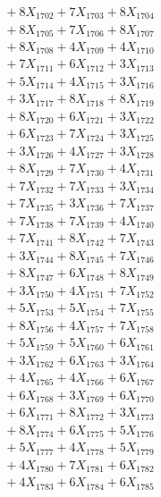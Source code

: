 \documentclass[a4paper,10pt]{article}
\begin{document}
{\begin{align}
&\;  + 8 X_{1702} + 7 X_{1703} + 8 X_{1704} \\[0.3ex]
&\;  + 8 X_{1705} + 7 X_{1706} + 8 X_{1707} \\[0.3ex]
&\;  + 8 X_{1708} + 4 X_{1709} + 4 X_{1710} \\[0.3ex]
&\;  + 7 X_{1711} + 6 X_{1712} + 3 X_{1713} \\[0.3ex]
&\;  + 5 X_{1714} + 4 X_{1715} + 3 X_{1716} \\[0.3ex]
&\;  + 3 X_{1717} + 8 X_{1718} + 8 X_{1719} \\[0.5ex]\allowbreak
&\;  + 8 X_{1720} + 6 X_{1721} + 3 X_{1722} \\[0.3ex]
&\;  + 6 X_{1723} + 7 X_{1724} + 3 X_{1725} \\[0.3ex]
&\;  + 3 X_{1726} + 4 X_{1727} + 3 X_{1728} \\[0.3ex]
&\;  + 8 X_{1729} + 7 X_{1730} + 4 X_{1731} \\[0.3ex]
&\;  + 7 X_{1732} + 7 X_{1733} + 3 X_{1734} \\[0.3ex]
&\;  + 7 X_{1735} + 3 X_{1736} + 7 X_{1737} \\[0.3ex]
&\;  + 7 X_{1738} + 7 X_{1739} + 4 X_{1740} \\[0.3ex]
&\;  + 7 X_{1741} + 8 X_{1742} + 7 X_{1743} \\[0.3ex]
&\;  + 3 X_{1744} + 8 X_{1745} + 7 X_{1746} \\[0.3ex]
&\;  + 8 X_{1747} + 6 X_{1748} + 8 X_{1749} \\[0.5ex]\allowbreak
&\;  + 3 X_{1750} + 4 X_{1751} + 7 X_{1752} \\[0.3ex]
&\;  + 5 X_{1753} + 5 X_{1754} + 7 X_{1755} \\[0.3ex]
&\;  + 8 X_{1756} + 4 X_{1757} + 7 X_{1758} \\[0.3ex]
&\;  + 5 X_{1759} + 5 X_{1760} + 6 X_{1761} \\[0.3ex]
&\;  + 3 X_{1762} + 6 X_{1763} + 3 X_{1764} \\[0.3ex]
&\;  + 4 X_{1765} + 4 X_{1766} + 6 X_{1767} \\[0.3ex]
&\;  + 6 X_{1768} + 3 X_{1769} + 6 X_{1770} \\[0.3ex]
&\;  + 6 X_{1771} + 8 X_{1772} + 3 X_{1773} \\[0.3ex]
&\;  + 8 X_{1774} + 6 X_{1775} + 5 X_{1776} \\[0.3ex]
&\;  + 5 X_{1777} + 4 X_{1778} + 5 X_{1779} \\[0.5ex]\allowbreak
&\;  + 4 X_{1780} + 7 X_{1781} + 6 X_{1782} \\[0.3ex]
&\;  + 4 X_{1783} + 6 X_{1784} + 6 X_{1785} \\[0.3ex]

\end{align}}
\end{document}
